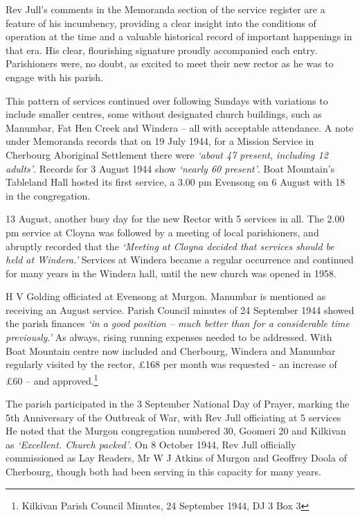 Rev Jull's comments in the Memoranda section of the service register are a feature of his incumbency, providing a clear insight into the conditions of operation at the time and a valuable historical record of important happenings in that era. His clear, flourishing signature proudly accompanied each entry. Parishioners were, no doubt, as excited to meet their new rector as he was to engage with his parish.

This pattern of services continued over following Sundays with variations to include smaller centres, some without designated church buildings, such as Manumbar, Fat Hen Creek and Windera -- all with acceptable attendance. A note under Memoranda records that on 19 July 1944, for a Mission Service in Cherbourg Aboriginal Settlement there were \emph{`about 47 present, including 12 adults'}. Records for 3 August 1944 show \emph{`nearly 60 present'}. Boat Mountain's Tableland Hall hosted its first service, a 3.00 pm Evensong on 6 August with 18 in the congregation.

13 August, another busy day for the new Rector with 5 services in all. The 2.00 pm service at Cloyna was followed by a meeting of local parishioners, and abruptly recorded that the \emph{`Meeting at Cloyna decided that services should be held at Windera.'} Services at Windera became a regular occurrence and continued for many years in the Windera hall, until the new church was opened in 1958.

H V Golding officiated at Evensong at Murgon. Manumbar is mentioned as receiving an August service. Parish Council minutes of 24 September 1944 showed the parish finances \emph{`in a good position -- much better than for a considerable time previously.'} As always, rising running expenses needed to be addressed. With Boat Mountain centre now included and Cherbourg, Windera and Manumbar regularly visited by the rector, £168 per month was requested - an increase of £60 -- and approved.\footnote{Kilkivan Parish Council Minutes, 24 September 1944, DJ 3 Box 3}

The parish participated in the 3 September National Day of Prayer, marking the 5th Anniversary of the Outbreak of War, with Rev Jull officiating at 5 services He noted that the Murgon congregation numbered 30, Goomeri 20 and Kilkivan as \emph{`Excellent. Church packed'}. On 8 October 1944, Rev Jull officially commissioned as Lay Readers, Mr W J Atkins of Murgon and Geoffrey Doola of Cherbourg, though both had been serving in this capacity for many years.

